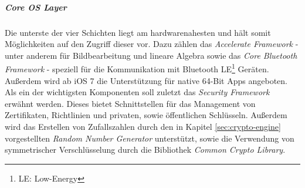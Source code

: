 			\subparagraph{Core OS Layer}
				Die unterste der vier Schichten liegt am hardwarenahesten und hält somit
				Möglichkeiten auf den Zugriff dieser vor. Dazu zählen das \textsl{Accelerate
				Framework} - unter anderem für Bildbearbeitung und lineare Algebra sowie das
				\textsl{Core Bluetooth Framework} - speziell für die Kommunikation mit
				Bluetooth LE\footnote{LE: Low-Energy} Geräten. Außerdem wird ab iOS 7
				die Unterstützung für native 64-Bit Apps angeboten. Als ein der wichtigsten
				Komponenten soll zuletzt das \textsl{Security Framework} erwähnt werden.
				Dieses bietet Schnittstellen für das Management von Zertifikaten, Richtlinien
				und privaten, sowie öffentlichen Schlüsseln. Außerdem wird das Erstellen von
				Zufallszahlen durch den in Kapitel \ref{sec:crypto-engine}
				vorgestellten \textsl{Random Number Generator} unterstützt, sowie die
				Verwendung von symmetrischer Verschlüsselung durch die Bibliothek
				\textsl{Common Crypto Library}.
